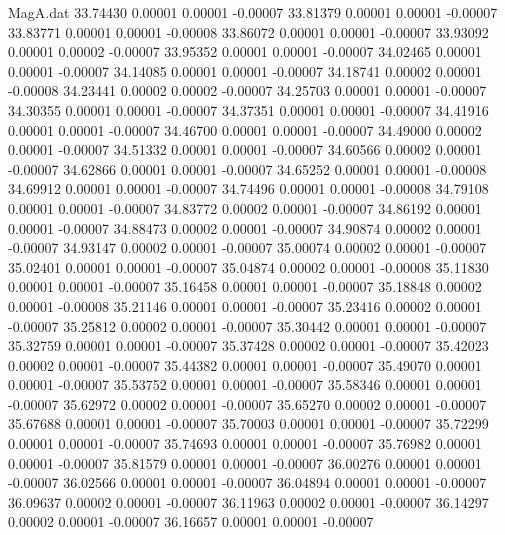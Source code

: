 \begin{filecontents}{MagA.dat}
  33.74430    0.00001    0.00001   -0.00007
  33.81379    0.00001    0.00001   -0.00007
  33.83771    0.00001    0.00001   -0.00008
  33.86072    0.00001    0.00001   -0.00007
  33.93092    0.00001    0.00002   -0.00007
  33.95352    0.00001    0.00001   -0.00007
  34.02465    0.00001    0.00001   -0.00007
  34.14085    0.00001    0.00001   -0.00007
  34.18741    0.00002    0.00001   -0.00008
  34.23441    0.00002    0.00002   -0.00007
  34.25703    0.00001    0.00001   -0.00007
  34.30355    0.00001    0.00001   -0.00007
  34.37351    0.00001    0.00001   -0.00007
  34.41916    0.00001    0.00001   -0.00007
  34.46700    0.00001    0.00001   -0.00007
  34.49000    0.00002    0.00001   -0.00007
  34.51332    0.00001    0.00001   -0.00007
  34.60566    0.00002    0.00001   -0.00007
  34.62866    0.00001    0.00001   -0.00007
  34.65252    0.00001    0.00001   -0.00008
  34.69912    0.00001    0.00001   -0.00007
  34.74496    0.00001    0.00001   -0.00008
  34.79108    0.00001    0.00001   -0.00007
  34.83772    0.00002    0.00001   -0.00007
  34.86192    0.00001    0.00001   -0.00007
  34.88473    0.00002    0.00001   -0.00007
  34.90874    0.00002    0.00001   -0.00007
  34.93147    0.00002    0.00001   -0.00007
  35.00074    0.00002    0.00001   -0.00007
  35.02401    0.00001    0.00001   -0.00007
  35.04874    0.00002    0.00001   -0.00008
  35.11830    0.00001    0.00001   -0.00007
  35.16458    0.00001    0.00001   -0.00007
  35.18848    0.00002    0.00001   -0.00008
  35.21146    0.00001    0.00001   -0.00007
  35.23416    0.00002    0.00001   -0.00007
  35.25812    0.00002    0.00001   -0.00007
  35.30442    0.00001    0.00001   -0.00007
  35.32759    0.00001    0.00001   -0.00007
  35.37428    0.00002    0.00001   -0.00007
  35.42023    0.00002    0.00001   -0.00007
  35.44382    0.00001    0.00001   -0.00007
  35.49070    0.00001    0.00001   -0.00007
  35.53752    0.00001    0.00001   -0.00007
  35.58346    0.00001    0.00001   -0.00007
  35.62972    0.00002    0.00001   -0.00007
  35.65270    0.00002    0.00001   -0.00007
  35.67688    0.00001    0.00001   -0.00007
  35.70003    0.00001    0.00001   -0.00007
  35.72299    0.00001    0.00001   -0.00007
  35.74693    0.00001    0.00001   -0.00007
  35.76982    0.00001    0.00001   -0.00007
  35.81579    0.00001    0.00001   -0.00007
  36.00276    0.00001    0.00001   -0.00007
  36.02566    0.00001    0.00001   -0.00007
  36.04894    0.00001    0.00001   -0.00007
  36.09637    0.00002    0.00001   -0.00007
  36.11963    0.00002    0.00001   -0.00007
  36.14297    0.00002    0.00001   -0.00007
  36.16657    0.00001    0.00001   -0.00007

\end{filecontents}
